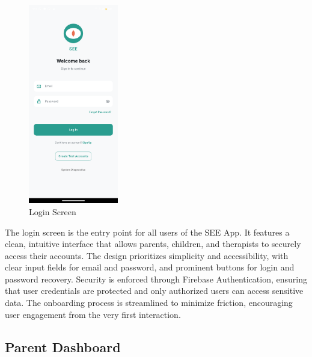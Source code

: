 \documentclass[12pt,a4paper]{article}
\newcommand{\sectiontitle}[1]{\subsection{#1}}
\begin{document}
\begin{figure}[H]
    \centering
    \includegraphics[width=0.35\textwidth]{Screenshots/Loginscreen.png}
    \caption{Login Screen}
    \label{fig:login-screen}
\end{figure}
The login screen is the entry point for all users of the SEE App. It features a clean, intuitive interface that allows parents, children, and therapists to securely access their accounts. The design prioritizes simplicity and accessibility, with clear input fields for email and password, and prominent buttons for login and password recovery. Security is enforced through Firebase Authentication, ensuring that user credentials are protected and only authorized users can access sensitive data. The onboarding process is streamlined to minimize friction, encouraging user engagement from the very first interaction.

\sectiontitle{Parent Dashboard}
\end{document}
